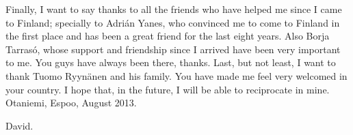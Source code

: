 Finally, I want to say thanks to all the friends who have helped me since I came to Finland; specially to Adrián Yanes, who convinced me to come to Finland in the first place and has been a great friend for the last eight years. Also Borja Tarrasó, whose support and friendship since I arrived have been very important to me. You guys have always been there, thanks. Last, but not least, I want to thank Tuomo Ryynänen and his family. You have made me feel very welcomed in your country. I hope that, in the future, I will be able to reciprocate in mine.\\




\vspace{1cm}
Otaniemi, Espoo, August 2013.

\vspace{0.5cm}
David.
\thispagestyle{plain}
\pagebreak

\tableofcontents

\pagebreak
